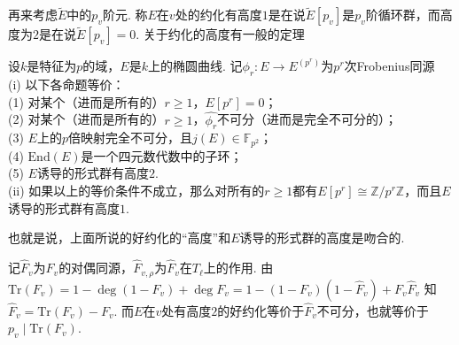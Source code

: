 再来考虑$\tilde{E}$中的$p_v$阶元.
称$E$在$v$处的约化有高度$1$是在说$\tilde{E}[p_v]$是$p_v$阶循环群，而高度为$2$是在说$\tilde{E}[p_v] = 0$.
关于约化的高度有一般的定理
\begin{cthm}
    设$k$是特征为$p$的域，$E$是$k$上的椭圆曲线. 记$\phi_r: E\to E^{(p^r)}$为$p^r$次Frobenius同源\\
    (i) 以下各命题等价：\\
    \quad (1) 对某个（进而是所有的）$r\geq 1$，$E[p^r] = 0$；\\
    \quad (2) 对某个（进而是所有的）$r\geq 1$，$\hat{\phi_r}$不可分（进而是完全不可分的）；\\
    \quad (3) $E$上的$p$倍映射完全不可分，且$j(E)\in \mathbb{F}_{p^2}$；\\
    \quad (4) $\mathrm{End}(E)$是一个四元数代数中的子环；\\
    \quad (5) $E$诱导的形式群有高度$2$.\\
    (ii) 如果以上的等价条件不成立，那么对所有的$r\geq 1$都有$E[p^r] \cong \mathbb{Z}/p^r\mathbb{Z}$，而且$E$诱导的形式群有高度$1$.
\end{cthm}
也就是说，上面所说的好约化的“高度”和$E$诱导的形式群的高度是吻合的.

记$\hat{F}_v$为$F_v$的对偶同源，$\hat{F}_{v,\rho}$为$\hat{F}_v$在$T_{\ell}$上的作用.
由$\mathrm{Tr}(F_v) = 1 - \deg(1-F_v)+\deg F_v = 1 - (1 - F_v)(1-\hat{F}_v) + F_v\hat{F}_v$
知$\hat{F}_v = \mathrm{Tr}(F_v) - F_v$.
而$E$在$v$处有高度$2$的好约化等价于$\hat{F}_v$不可分，也就等价于$p_v \mid \mathrm{Tr}(F_v)$.



